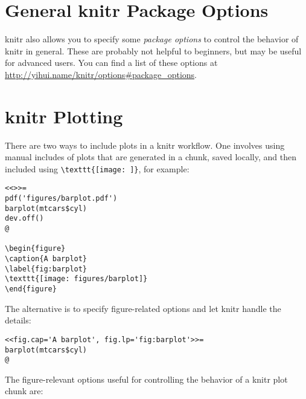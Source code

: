 \documentclass[11pt, a4paper]{article}
\begin{document}
\vspace{1em}
\section*{General knitr Package Options}

knitr also allows you to specify some \textit{package options} to control the behavior of knitr in general. These are probably not helpful to beginners, but may be useful for advanced users. You can find a list of these options at \href{http://yihui.name/knitr/options#package_options}{http://yihui.name/knitr/options\#package\_options}.


\clearpage
\section*{knitr Plotting}

There are two ways to include plots in a knitr workflow. One involves using manual includes of plots that are generated in a chunk, saved locally, and then included using \verb|\texttt{[image: ]}|, for example:

\begin{verbatim}
<<>>=
pdf('figures/barplot.pdf')
barplot(mtcars$cyl)
dev.off()
@

\begin{figure}
\caption{A barplot}
\label{fig:barplot}
\texttt{[image: figures/barplot]}
\end{figure}
\end{verbatim}

\noindent The alternative is to specify figure-related options and let knitr handle the details:

\begin{verbatim}
<<fig.cap='A barplot', fig.lp='fig:barplot'>>=
barplot(mtcars$cyl)
@
\end{verbatim}

\noindent The figure-relevant options useful for controlling the behavior of a knitr plot chunk are:
\end{document}
